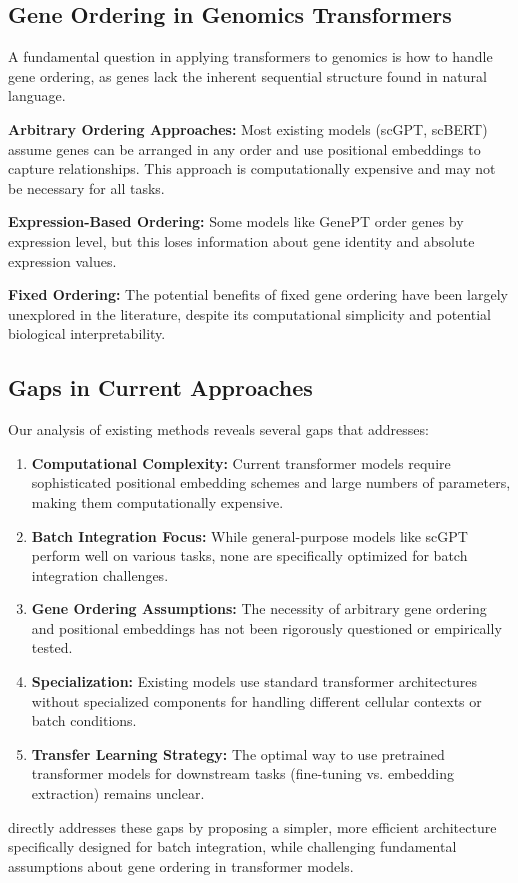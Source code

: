 \subsection{Gene Ordering in Genomics Transformers}

A fundamental question in applying transformers to genomics is how to handle gene ordering, as genes lack the inherent sequential structure found in natural language.

\textbf{Arbitrary Ordering Approaches:} Most existing models (scGPT, scBERT) assume genes can be arranged in any order and use positional embeddings to capture relationships. This approach is computationally expensive and may not be necessary for all tasks.

\textbf{Expression-Based Ordering:} Some models like GenePT \citep{genept2023} order genes by expression level, but this loses information about gene identity and absolute expression values.

\textbf{Fixed Ordering:} The potential benefits of fixed gene ordering have been largely unexplored in the literature, despite its computational simplicity and potential biological interpretability.

\subsection{Gaps in Current Approaches}

Our analysis of existing methods reveals several gaps that \bioformer{} addresses:

\begin{enumerate}
\item \textbf{Computational Complexity:} Current transformer models require sophisticated positional embedding schemes and large numbers of parameters, making them computationally expensive.

\item \textbf{Batch Integration Focus:} While general-purpose models like scGPT perform well on various tasks, none are specifically optimized for batch integration challenges.

\item \textbf{Gene Ordering Assumptions:} The necessity of arbitrary gene ordering and positional embeddings has not been rigorously questioned or empirically tested.

\item \textbf{Specialization:} Existing models use standard transformer architectures without specialized components for handling different cellular contexts or batch conditions.

\item \textbf{Transfer Learning Strategy:} The optimal way to use pretrained transformer models for downstream tasks (fine-tuning vs. embedding extraction) remains unclear.
\end{enumerate}

\bioformer{} directly addresses these gaps by proposing a simpler, more efficient architecture specifically designed for batch integration, while challenging fundamental assumptions about gene ordering in transformer models.